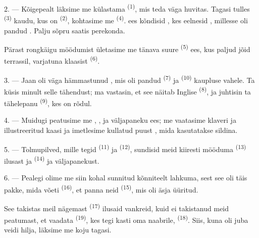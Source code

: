 2. --- Kõigepealt läksime me külastama  \textsuperscript{(1)},
mis teda väga huvitas. Tagasi tulles  \textsuperscript{(3)} kaudu, kus on
 \textsuperscript{(2)}, kohtasime me 
\textsuperscript{(4)}.  ees kõndisid , kes
eelnesid , millesse oli pandud . Palju sõpru saatis
 perekonda.

Pärast rongkäigu möödumist ületasime me tänava suure 
\textsuperscript{(5)} ees, kus paljud  jõid  terrassil,
varjatuna klaasist  \textsuperscript{(6)}.

3. --- Jaan oli väga hämmastunud , mis oli pandud
 \textsuperscript{(7)} ja 
\textsuperscript{(10)} kaupluse vahele. Ta küsis minult selle tähendust; ma vastasin, et
see näitab Inglise  \textsuperscript{(8)}, ja juhtisin ta tähelepanu
 \textsuperscript{(9)}, kes on rõdul.

\VUsaut{3.0mm}

4. --- Muidugi peatusime me , ,
 ja  väljapaneku ees; me vaatasime klaveri
 ja  illustreeritud kaasi ja imetlesime kullatud
puust , mida kasutatakse sildina.

5. --- Tolmupilved, mille tegid  \textsuperscript{(11)} ja
 \textsuperscript{(12)}, sundisid meid kiiresti mööduma
 \textsuperscript{(13)} ilusast  ja
 \textsuperscript{(14)}  ja  väljapanekust.

6. --- Pealegi olime me siin kohal sunnitud kõnniteelt lahkuma, sest see oli täis
pakke, mida võeti  \textsuperscript{(16)}, et panna neid
 \textsuperscript{(15)}, mis oli äsja üüritud.

See takistas meil nägemast  \textsuperscript{(17)} ilusaid vankreid,
kuid ei takistanud meid peatumast, et vaadata  \textsuperscript{(19)},
kes tegi kasti oma naabrile, 
\textsuperscript{(18)}. Siis, kuna oli juba veidi hilja, läksime me koju tagasi.


